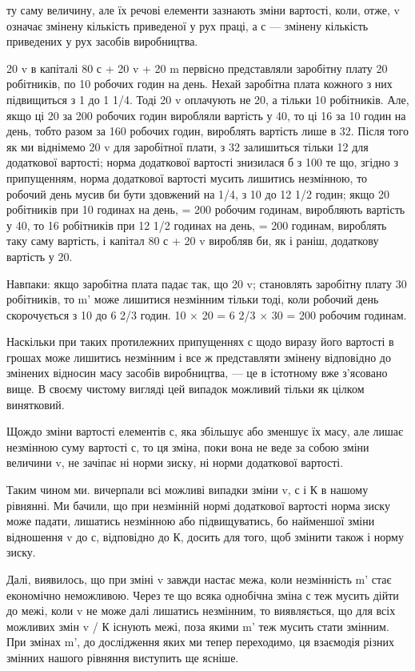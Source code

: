 ту саму величину, але їх речові елементи зазнають зміни вартості,
коли, отже, v означає змінену кількість приведеної у рух
праці, а с — змінену кількість приведених у рух засобів виробництва.

20 v в капіталі 80 с + 20 v + 20 m первісно представляли заробітну
плату 20 робітників, по 10 робочих годин на день. Нехай
заробітна плата кожного з них підвищиться з 1 до 1 1/4. Тоді 20 v
оплачують не 20, а тільки 10 робітників. Але, якщо ці 20 за
200 робочих годин виробляли вартість у 40, то ці 16 за 10 годин
на день, тобто разом за 160 робочих годин, вироблять вартість
лише в 32. Після того як ми віднімемо 20 v для заробітної
плати, з 32 залишиться тільки 12 для додаткової вартості; норма
додаткової вартості знизилася б з 100%
те що, згідно з припущенням, норма додаткової вартості мусить
лишитись незмінною, то робочий день мусив би бути здовжений
на 1/4, з 10 до 12 1/2 годин; якщо 20 робітників при 10 годинах
на день, = 200 робочим годинам, виробляють вартість у 40, то
16 робітників при 12 1/2 годинах на день, = 200 годинам, вироблять
таку саму вартість, і капітал 80 с + 20 v виробляв би, як і раніш,
додаткову вартість у 20.

Навпаки: якщо заробітна плата падає так, що 20 v; становлять
заробітну плату 30 робітників, то m' може лишитися
незмінним тільки тоді, коли робочий день скорочується з 10
до 6 2/3 годин. 10 × 20 = 6 2/3 × 30 = 200 робочим годинам.

Наскільки при таких протилежних припущеннях с щодо виразу
його вартості в грошах може лишитись незмінним і все ж
представляти змінену відповідно до змінених відносин масу
засобів виробництва, — це в істотному вже з’ясовано вище.
В своєму чистому вигляді цей випадок можливий тільки як цілком
винятковий.

Щождо зміни вартості елементів с, яка збільшує або зменшує
їх масу, але лишає незмінною суму вартості с, то ця зміна, поки
вона не веде за собою зміни величини v, не зачіпає ні норми
зиску, ні норми додаткової вартості.

Таким чином ми. вичерпали всі можливі випадки зміни v, с
і К в нашому рівнянні. Ми бачили, що при незмінній нормі додаткової
вартості норма зиску може падати, лишатись незмінною
або підвищуватись, бо найменшої зміни відношення v до с,
відповідно до К, досить для того, щоб змінити також і норму
зиску.

Далі, виявилось, що при зміні v завжди настає межа, коли незмінність
m' стає економічно неможливою. Через те що всяка
однобічна зміна с теж мусить дійти до межі, коли v не може
далі лишатись незмінним, то виявляється, що для всіх можливих
змін v / К існують межі, поза якими m' теж мусить стати змінним.
При змінах m', до дослідження яких ми тепер переходимо, ця
взаємодія різних змінних нашого рівняння виступить ще ясніше.
